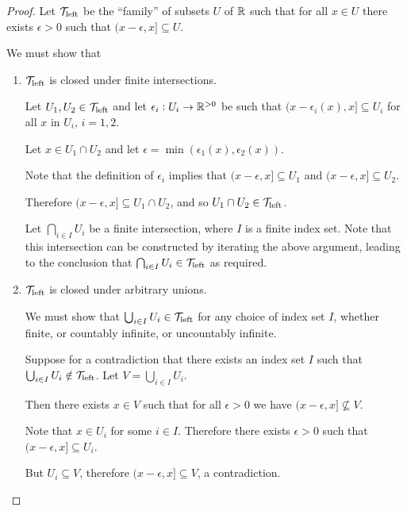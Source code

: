 \documentclass[12pt]{article}
\begin{document}
\begin{proof}
  Let $\mathcal T_\text{left}$ be the ``family'' of subsets $U$ of $\mathbb{R}$ such that for all $x \in U$ there exists
  $\epsilon > 0$ such that $(x - \epsilon, x] \subseteq U$.

  We must show that
  \begin{enumerate}
  \item $\mathcal T_\text{left}$ is closed under finite intersections.

    Let $U_1, U_2 \in \mathcal T_\text{left}$ and let $\epsilon_i:U_i \to \mathbb{R}^{>0}$ be such that
    $(x - \epsilon_i(x), x] \subseteq U_i$ for all $x$ in $U_i$, $i = 1, 2$.

    Let $x \in U_1 \cap U_2$ and let $\epsilon = \min(\epsilon_1(x), \epsilon_2(x))$.

    Note that the definition of $\epsilon_i$ implies that $(x - \epsilon, x] \subseteq U_1$ and
    $(x - \epsilon, x] \subseteq U_2$.

    Therefore $(x - \epsilon, x] \subseteq U_1 \cap U_2$, and so $U_1 \cap U_2 \in \mathcal T_\text{left}$.

    Let $\bigcap_{i \in I} U_i$ be a finite intersection, where $I$ is a finite index set. Note
    that this intersection can be constructed by iterating the above argument, leading to the
    conclusion that $\bigcap_{i \in I} U_i \in \mathcal T_\text{left}$ as required.

  \item $\mathcal T_\text{left}$ is closed under arbitrary unions.

    We must show that $\bigcup_{i \in I} U_i \in \mathcal T_\text{left}$ for any choice of index set $I$, whether
    finite, or countably infinite, or uncountably infinite.

    Suppose for a contradiction that there exists an index set $I$ such that
    $\bigcup_{i \in I} U_i \notin \mathcal T_\text{left}$. Let $V = \bigcup_{i \in I} U_i$.

    Then there exists $x \in V$ such that for all $\epsilon > 0$ we have
    $(x - \epsilon, x] \not\subseteq V$.

    Note that $x \in U_i$ for some $i \in I$. Therefore there exists $\epsilon > 0$ such that
    $(x - \epsilon, x] \subseteq U_i$.

    But $U_i \subseteq V$, therefore $(x - \epsilon, x] \subseteq V$, a contradiction.
  \end{enumerate}
\end{proof}
\end{document}
